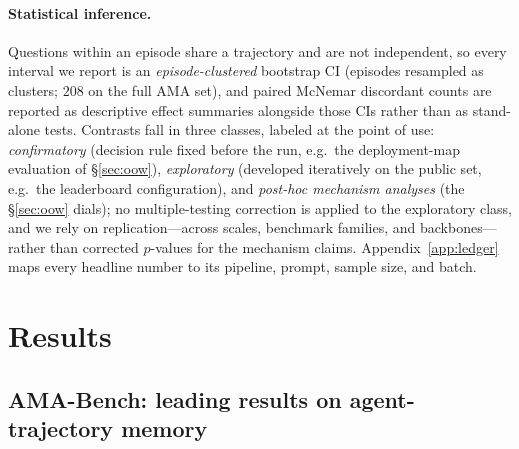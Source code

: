 \documentclass{article} %
\begin{document}
\paragraph{Statistical inference.} Questions within an episode share a trajectory and
are not independent, so every interval we report is an \emph{episode-clustered}
bootstrap CI (episodes resampled as clusters; $208$ on the full AMA set), and paired
McNemar discordant counts are reported as descriptive effect summaries alongside those
CIs rather than as stand-alone tests. Contrasts fall in three classes, labeled at the
point of use: \emph{confirmatory} (decision rule fixed before the run, e.g.\ the
deployment-map evaluation of \S\ref{sec:oow}), \emph{exploratory} (developed
iteratively on the public set, e.g.\ the leaderboard configuration), and
\emph{post-hoc mechanism analyses} (the \S\ref{sec:oow} dials); no multiple-testing
correction is applied to the exploratory class, and we rely on replication---across
scales, benchmark families, and backbones---rather than corrected $p$-values for the
mechanism claims. Appendix~\ref{app:ledger} maps every headline number to its
pipeline, prompt, sample size, and batch.

\section{Results}
\label{sec:results}

\subsection{AMA-Bench: leading results on agent-trajectory memory}
\label{sec:ama}
\end{document}
